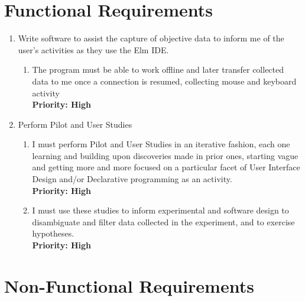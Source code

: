 \section{Functional Requirements}

\begin{enumerate}
  \item Write software to assist the capture of objective data to inform me of
	  the user's activities as they use the Elm IDE. 
  \label{itm:compile}
    \begin{enumerate}
      \item The program must be able to work offline and later transfer
	      collected data to me once a connection is resumed, collecting
	      mouse and keyboard activity\\
        \textbf{Priority: High}
      \label{itm:record}
    \end{enumerate}
  \item Perform Pilot and User Studies
    \begin{enumerate}
      \item I must perform Pilot and User Studies in an iterative fashion, each
	      one learning and building upon discoveries made in prior ones,
	      starting vague and getting more and more focused on a particular
	      facet of User Interface Design and/or Declarative programming as
	      an activity.\\
        \textbf{Priority: High}
      \item I must use these studies to inform experimental and software design
	      to disambiguate and filter data collected in the experiment, and
	      to exercise hypotheses.\\
        \textbf{Priority: High}
    \end{enumerate}
\end{enumerate}

\section{Non-Functional Requirements}

